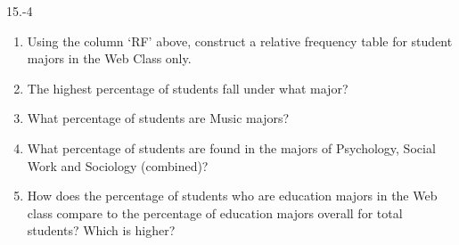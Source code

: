 \begin{exsol@solution}{15.-4}

  \begin{enumerate}
  \item	Using the column `RF' above, construct a relative frequency table for student majors in the Web Class only.
  \item	The highest percentage of students fall under what major?
  \item	What percentage of students are Music majors?
  \item	What percentage of students are found in the majors of Psychology, Social Work and Sociology (combined)?
  \item	How does the percentage of students who are education majors in the Web class compare to the percentage of education majors overall for total students?  Which is higher?
\end{enumerate}
\end{exsol@solution}
